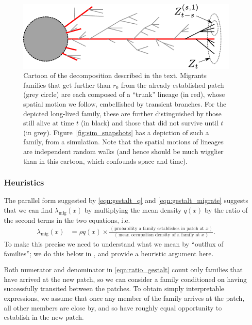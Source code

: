 \documentclass{article}
\newcommand{\migrate}{\lambda_\text{mig}}
\begin{document}
\begin{figure}[ht!!]
  \begin{center}
    \includegraphics{branching-concept}
  \end{center}
\caption{Cartoon of the decomposition described in the text. 
Migrants families that get further than $r_0$ from the already-established patch (grey circle)
are each composed of a ``trunk'' lineage (in red), whose spatial motion we follow,
embellished by transient branches.
For the depicted long-lived family, these are further distinguished by those still alive at time $t$ (in black)
and those that did not survive until $t$ (in grey).
Figure~\ref{fig:sim_snapshots} has a depiction of such a family, from a simulation. 
Note that the spatial motions of lineages are independent random walks
(and hence should be much wigglier than in this cartoon, which confounds space and time).
} \label{fig:branching_decomp}
\end{figure}


\subsubsection{Heuristics}
\label{ss:heuristics}

The parallel form suggested by \eqref{eqn:gestalt_q} and \eqref{eqn:gestalt_migrate}
suggests that we can find $\migrate(x)$ by multiplying the mean density $q(x)$
by the ratio of the second terms in the two equations,
i.e.
\begin{align} \label{eqn:ratio_gestalt}
  \migrate(x) 
    &= \rho q(x) \times 
    \frac{
        \text{ ( probability a family establishes in patch at $x$ ) }
    }{
        \text{ ( mean occupation density of a family at $x$ ) }
    } .
\end{align}
To make this precise we need to understand what we mean by ``outflux of families'';
we do this below in ,
and provide a heuristic argument here.

Both numerator and denominator in \eqref{eqn:ratio_gestalt} 
count only families that have arrived at the new patch,
so we can consider a family conditioned on having successfully transited between the patches.
To obtain simply interpretable expressions,
we assume that once any member of the family arrives at the patch,
all other members are close by, and so have roughly equal opportunity
to establish in the new patch.
\end{document}

